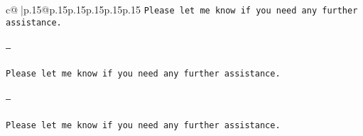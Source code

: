 \documentclass{article}
\begin{document}
{\begin{supertabular}{c@{$\;$}|p{.15\linewidth}@{}p{.15\linewidth}p{.15\linewidth}p{.15\linewidth}p{.15\linewidth}p{.15\linewidth}}
{{{\tt Please let me know if you need any further assistance. \\ \tt \\ \tt ---\\ \tt \\ \tt Please let me know if you need any further assistance. \\ \tt \\ \tt ---\\ \tt \\ \tt Please let me know if you need any further assistance. \\ \tt \\ }}}
\end{supertabular}}
\end{document}
